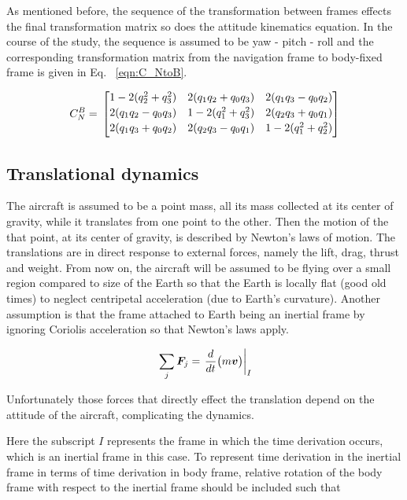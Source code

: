 As mentioned before, the sequence of the transformation between frames effects the final transformation matrix so does the attitude kinematics equation. 
In the course of the study, the sequence is assumed to be yaw - pitch - roll and the corresponding transformation matrix from the navigation frame to body-fixed frame is given in Eq. ~\ref{eqn:C_NtoB}.

\begin{equation}{\label{eqn:C_NtoB}}
C_N^B
= \,
\begin{bmatrix}
1 - 2(q_2^2 + q_3^2) & 2(q_1 q_2 + q_0 q_3) & 2(q_1 q_3 - q_0 q_2)  \\[0.2em]
2(q_1 q_2 - q_0 q_3) & 1 - 2(q_1^2 + q_3^2) & 2(q_2 q_3 + q_0 q_1)\\[0.2em]
2(q_1 q_3 + q_0 q_2) & 2(q_2 q_3 - q_0 q_1) & 1 - 2(q_1^2 + q_2^2) \\[0.2em]
\end{bmatrix}
\end{equation}


\subsection{Translational dynamics}

The aircraft is assumed to be a point mass, all its mass collected at its center of gravity, while it translates from one point to the other.
Then the motion of the that point, at its center of gravity, is described by Newton's laws of motion.
The translations are in direct response to external forces, namely the lift, drag, thrust and weight.
From now on, the aircraft will be assumed to be flying over a small region compared to size of the Earth so that the Earth is locally flat (good old times) to neglect centripetal acceleration (due to Earth's curvature). 
Another assumption is that the frame attached to Earth being an inertial frame by ignoring Coriolis acceleration so that Newton's laws apply. 

\begin{equation}{\label{eqn:newtonsSecondLaw}}
\sum_j \bm{F}_j = \left. \frac{d}{dt} \big( m \bm{v} \big) \right|_I
\end{equation}

Unfortunately those forces that directly effect the translation depend on the attitude of the aircraft, complicating the dynamics.

Here the subscript $I$ represents the frame in which the time derivation occurs, which is an inertial frame in this case. 
To represent time derivation in the inertial frame in terms of time derivation in body frame, relative rotation of the body frame with respect to the inertial frame should be included such that


